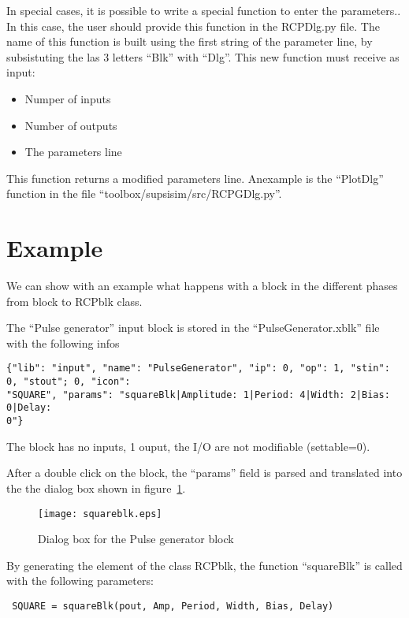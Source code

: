 In special cases, it is possible to write a special function to 
enter the parameters.. In this case, the user should provide this function in 
the RCPDlg.py file.
The name of this function is built using the first string of the parameter 
line, by subsistuting the las 3 letters ``Blk'' with ``Dlg''. This new function 
must receive as input:

\begin{itemize}
\item Numper of inputs
\item Number of outputs
\item The parameters line
\end{itemize}

This function returns a modified parameters line. Anexample is the ``PlotDlg'' 
function in the file ``toolbox/supsisim/src/RCPGDlg.py''.

\section{Example}
We can show with an example what happens with a block in the different phases 
from block to RCPblk class.

The ``Pulse generator'' input block is stored in the ``PulseGenerator.xblk'' 
file with 
the following infos

\tiny
\begin{verbatim}
{"lib": "input", "name": "PulseGenerator", "ip": 0, "op": 1, "stin": 0, "stout"; 0, "icon": 
"SQUARE", "params": "squareBlk|Amplitude: 1|Period: 4|Width: 2|Bias: 0|Delay: 
0"}
\end{verbatim}
\normalsize

The block has no inputs, 1 ouput, the I/O are not modifiable (settable=0).

After a double click on the block, the ``params'' field is parsed and 
translated 
into the the dialog box shown in figure~\ref{Fig:squareblk}.

 \begin{figure}[htbp]	
 \centering
 \texttt{[image: squareblk.eps]}
 \caption{Dialog box for the Pulse generator block}
 \label{Fig:squareblk}
 \end{figure}

 By generating the element of the class RCPblk, the function ``squareBlk'' is 
called with the following parameters:
 
 \begin{verbatim}
 SQUARE = squareBlk(pout, Amp, Period, Width, Bias, Delay)
 \end{verbatim}
 
